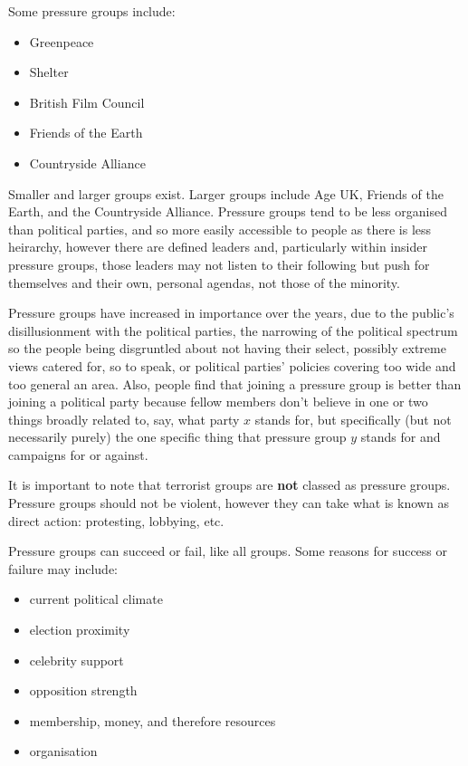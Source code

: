 \documentclass[12pt]{article}
\begin{document}
Some pressure groups include:

\begin{itemize}
	\item{Greenpeace}
	\item{Shelter}
	\item{British Film Council}
	\item{Friends of the Earth}
	\item{Countryside Alliance}
\end{itemize}

Smaller and larger groups exist.  Larger groups include Age UK, Friends of
the Earth, and the Countryside Alliance.  Pressure groups tend to be less
organised than political parties, and so more easily accessible to people
as there is less heirarchy, however there are defined leaders and,
particularly within insider pressure groups, those leaders may not listen
to their following but push for themselves and their own, personal agendas,
not those of the minority.

Pressure groups have increased in importance over the years, due to the
public's disillusionment with the political parties, the narrowing of the
political spectrum so the people being disgruntled about not having their
select, possibly extreme views catered for, so to speak, or political
parties' policies covering too wide and too general an area.  Also, people
find that joining a pressure group is better than joining a political party
because fellow members don't believe in one or two things broadly related
to, say, what party $x$ stands for, but specifically (but not necessarily
purely) the one specific thing that pressure group $y$ stands for and
campaigns for or against.

It is important to note that terrorist groups are \textbf{not} classed as
pressure groups.  Pressure groups should not be violent, however they can
take what is known as direct action: protesting, lobbying, etc.

Pressure groups can succeed or fail, like all groups.  Some reasons for
success or failure may include:

\begin{itemize}
	\item{current political climate}
	\item{election proximity}
	\item{celebrity support}
	\item{opposition strength}
	\item{membership, money, and therefore resources}
	\item{organisation}
\end{itemize}
\end{document}
